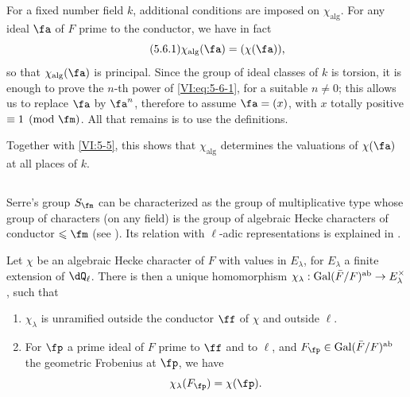 For a fixed number field $k$, additional conditions are 
imposed on $\chi_\text{alg}$. For any ideal $\fa$ of $F$ prime to the 
conductor, we have in fact 
\begin{equation*}\tag{5.6.1}\label{VI:eq:5-6-1}
  \chi_\text{alg}(\fa) = (\chi(\fa)) \text{,} 
\end{equation*}
so that $\chi_\text{alg}(\fa)$ is principal. Since the group of 
  ideal classes of $k$ is torsion, it is enough to prove the $n$-th power 
of \eqref{VI:eq:5-6-1}, for a suitable $n\ne 0$; this allows us 
to replace $\fa$ by $\fa^n$, therefore to assume $\fa=(x)$, with $x$ totally 
positive $\equiv 1\pmod\fm$. All that remains is to use the definitions. 

Together with \ref{VI:5-5}, this shows that $\chi_\text{alg}$ determines the 
valuations of $\chi(\fa)$ at all places of $k$. 





\subsection{}\label{VI:5-7}

Serre's group $S_\fm$ can be characterized as the 
group of multiplicative type whose group of characters (on any 
field) is the group of algebraic Hecke characters of conductor 
$\leqslant \fm$ (see \cite[II 2.1 et 2.2]{se68}). Its relation with 
$\ell$-adic representations is explained in \cite[II 2.3]{se68}.





\begin{theorem_}[{\cite{se68}}]\label{VI:5-8}
Let $\chi$ be an algebraic Hecke character of $F$ with values in $E_\lambda$, for 
$E_\lambda$ a finite extension of $\dQ_\ell$. There is then a unique 
  homomorphism $\chi_\lambda:\operatorname{Gal}(\bar F/F)^\textnormal{ab} \to E_\lambda^\times$, such 
that 
\begin{enumerate}[\indent (i)]
  \item $\chi_\lambda$ is unramified outside the conductor $\ff$ of 
    $\chi$ and outside $\ell$. 
  \item For $\fp$ a prime ideal of $F$ prime to $\ff$ and to $\ell$, 
    and $F_\fp\in \gal(\bar F/F)^\textnormal{ab}$ the geometric Frobenius 
    at $\fp$, we have 
    \[
      \chi_\lambda(F_\fp) = \chi(\fp) \text{.}
    \] 
\end{enumerate}
\end{theorem_}





